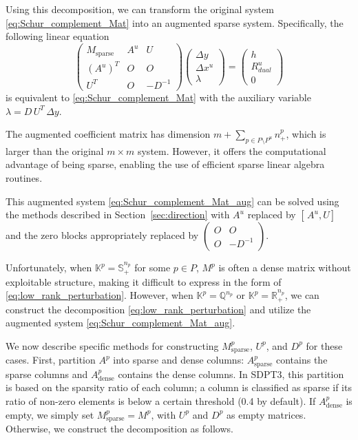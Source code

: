 Using this decomposition, we can transform the original system \eqref{eq:Schur_complement_Mat} 
into an augmented sparse system. Specifically, the following linear equation
\begin{equation}
  \begin{pmatrix}
    M_{\mathrm{sparse}} & A^u & U \\
    (A^u)^T & O & O \\
    U^T & O & -D^{-1}
  \end{pmatrix}
  \begin{pmatrix}
    \Delta y \\
    \Delta x^u \\
    \lambda
  \end{pmatrix}
  =
  \begin{pmatrix}
    h \\
    R^u_{dual} \\
    0
  \end{pmatrix}
  \label{eq:Schur_complement_Mat_aug}
\end{equation}
is equivalent to \eqref{eq:Schur_complement_Mat} with the auxiliary variable $\lambda = D\,U^T\,\Delta y$.

The augmented coefficient matrix has dimension $m+\sum_{p\in P\setminus P^u} n^p_+$, 
which is larger than the original $m \times m$ system. 
However, it offers the computational advantage of being sparse, 
enabling the use of efficient sparse linear algebra routines.

This augmented system \eqref{eq:Schur_complement_Mat_aug} can be solved using the methods 
described in Section~\ref{sec:direction} with 
$A^u$ replaced by $[\,A^u, U]$ and the zero blocks appropriately replaced by 
$\begin{pmatrix} O & O \\ O & -D^{-1} \end{pmatrix}$.

Unfortunately, when $\mathbb{K}^p = \mathbb{S}^{n_p}_+$ for some $p \in P$, 
$M^p$ is often a dense matrix without exploitable structure, 
making it difficult to express in the form of \eqref{eq:low_rank_perturbation}.
However, when $\mathbb{K}^p = \mathbb{Q}^{n_p}$ or $\mathbb{K}^p = \mathbb{R}^{n_p}_+$, 
we can construct the decomposition \eqref{eq:low_rank_perturbation} 
and utilize the augmented system \eqref{eq:Schur_complement_Mat_aug}.

We now describe specific methods for constructing $M^p_{\mathrm{sparse}}$, $U^p$, and $D^p$ 
for these cases.
First, partition $A^p$ into sparse and dense columns:
$A^p_{\mathrm{sparse}}$ contains the sparse columns and 
$A^p_{\mathrm{dense}}$ contains the dense columns.
In SDPT3, this partition is based on the sparsity ratio of each column;
a column is classified as sparse if its ratio of non-zero elements 
is below a certain threshold (0.4 by default).
If $A^p_{\mathrm{dense}}$ is empty, we simply set $M^p_{\mathrm{sparse}} = M^p$, 
with $U^p$ and $D^p$ as empty matrices.
Otherwise, we construct the decomposition as follows.


